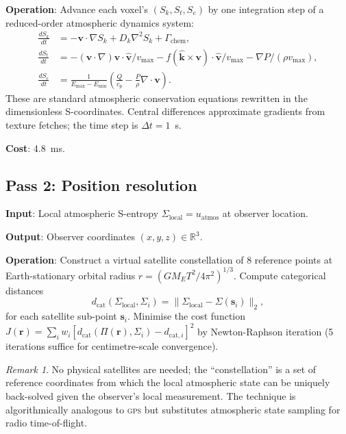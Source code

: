 \documentclass[11pt,twocolumn,a4paper]{article}
\theoremstyle{definition}
\theoremstyle{remark}
\newtheorem{remark}[theorem]{Remark}
\newcommand{\Rvec}{\mathbf{r}}
\newcommand{\Sigmaf}{\Sigma}
\begin{document}
\textbf{Operation}: Advance each voxel's $(S_k, S_t, S_e)$ by one integration step of a reduced-order atmospheric dynamics system:
\begin{align}
\frac{dS_k}{dt} &= -\mathbf{v}\cdot \nabla S_k + D_k \nabla^2 S_k + \Gamma_\text{chem},\\
\frac{dS_t}{dt} &= -(\mathbf{v}\cdot\nabla)\mathbf{v}\cdot \hat{\mathbf{v}}/v_{\max} - f(\hat{\mathbf{k}} \times \mathbf{v})\cdot \hat{\mathbf{v}}/v_{\max} - \nabla P/(\rho v_{\max}),\\
\frac{dS_e}{dt} &= \frac{1}{E_{\max}-E_{\min}}\left(\frac{Q}{c_p} - \frac{P}{\rho}\nabla\cdot\mathbf{v}\right).
\end{align}
These are standard atmospheric conservation equations \citep{holton2013} rewritten in the dimensionless S-coordinates. Central differences approximate gradients from texture fetches; the time step is $\Delta t = 1$~s.

\textbf{Cost}: 4.8~ms.

\subsection{Pass 2: Position resolution}

\textbf{Input}: Local atmospheric S-entropy $\Sigmaf_\text{local} = u_\text{atmos}$ at observer location.

\textbf{Output}: Observer coordinates $(x,y,z) \in \mathbb{R}^3$.

\textbf{Operation}: Construct a virtual satellite constellation of 8 reference points at Earth-stationary orbital radius $r = (GM_E T^2/4\pi^2)^{1/3}$. Compute categorical distances
\begin{equation}
d_\text{cat}(\Sigmaf_\text{local}, \Sigmaf_i) = \|\Sigmaf_\text{local} - \Sigmaf(\mathbf{s}_i)\|_2,
\end{equation}
for each satellite sub-point $\mathbf{s}_i$. Minimise the cost function $J(\Rvec) = \sum_i w_i [d_\text{cat}(\Pi(\Rvec), \Sigmaf_i) - d_{\text{cat},i}]^2$ by Newton-Raphson iteration (5 iterations suffice for centimetre-scale convergence).

\begin{remark}
No physical satellites are needed; the ``constellation'' is a set of reference coordinates from which the local atmospheric state can be uniquely back-solved given the observer's local measurement. The technique is algorithmically analogous to \textsc{gps} \citep{misra2010} but substitutes atmospheric state sampling for radio time-of-flight.
\end{remark}
\end{document}
